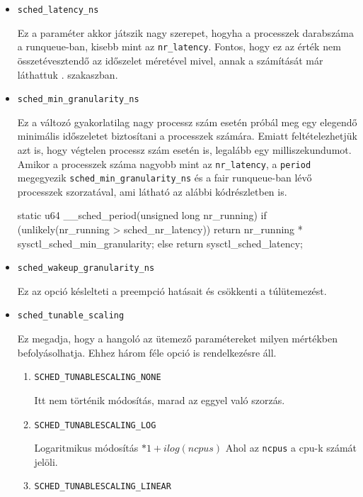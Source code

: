 \begin{itemize}
\item \texttt{sched\_latency\_ns}

Ez a paraméter akkor játszik nagy szerepet, hogyha a processzek darabszáma a runqueue-ban, kisebb mint az \texttt{nr\_latency}. Fontos, hogy ez az érték nem összetévesztendő az időszelet méretével mivel, annak a számítását már láthattuk . szakaszban. 

\item \texttt{sched\_min\_granularity\_ns}

Ez a változó gyakorlatilag nagy processz szám esetén próbál meg egy elegendő minimális időszeletet biztosítani a processzek számára. Emiatt feltételezhetjük azt is, hogy végtelen processz szám esetén is, legalább egy milliszekundumot.
Amikor a processzek száma nagyobb mint az \texttt{nr\_latency}, a \texttt{period} megegyezik \texttt{sched\_min\_granularity\_ns} és a fair runqueue-ban lévő processzek szorzatával, ami látható az alábbi kódrészletben is.
\begin{cpp}
static u64 __sched_period(unsigned long nr_running)
{
    if (unlikely(nr_running > sched_nr_latency))
        return nr_running * sysctl_sched_min_granularity;
    else
        return sysctl_sched_latency;
}
\end{cpp}

\item \texttt{sched\_wakeup\_granularity\_ns}

Ez az opció késlelteti a preempció hatásait és csökkenti a túlütemezést.

\item \texttt{sched\_tunable\_scaling}

Ez megadja, hogy a hangoló az ütemező paramétereket milyen mértékben befolyásolhatja. Ehhez három féle opció is rendelkezésre áll.
\begin{enumerate}
\item \texttt{SCHED\_TUNABLESCALING\_NONE}

Itt nem történik módosítás, marad az eggyel való szorzás.
\item \texttt{SCHED\_TUNABLESCALING\_LOG}

Logaritmikus módosítás $*1+ilog(ncpus)$
Ahol az \texttt{ncpus} a cpu-k számát jelöli.

\item \texttt{SCHED\_TUNABLESCALING\_LINEAR}


\end{enumerate}
\end{itemize}
